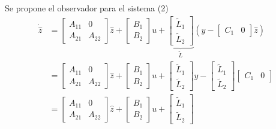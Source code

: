 Se propone el observador para el sistema (2)
\[
    \begin{split}
        \dot{\hat{z}} & = 
        \begin{bmatrix}
            A_{11} & 0 \\ 
            A_{21} & A_{22}
        \end{bmatrix} \hat{z} +
        \begin{bmatrix}
            B_{1} \\ B_{2}
        \end{bmatrix} u +
        \underbrace{
            \begin{bmatrix}
                \tilde{L}_{1} \\ \tilde{L}_{2}
            \end{bmatrix}
        }_{\tilde{L}}
        (y - \begin{bmatrix}
                C_{1} & 0
             \end{bmatrix} \hat{z} ) \\
        & = 
        \begin{bmatrix}
            A_{11} & 0 \\ 
            A_{21} & A_{22}
        \end{bmatrix} \hat{z} +
        \begin{bmatrix}
            B_{1} \\ B_{2}
        \end{bmatrix} u +
        \begin{bmatrix}
            \tilde{L}_{1} \\ \tilde{L}_{2}
        \end{bmatrix} y -
        \begin{bmatrix}
            \tilde{L}_{1} \\ \tilde{L}_{2}
        \end{bmatrix}
        \begin{bmatrix}
            C_{1} & 0
        \end{bmatrix} \\
        & = 
        \begin{bmatrix}
            A_{11} & 0 \\ 
            A_{21} & A_{22}
        \end{bmatrix} \hat{z} +
        \begin{bmatrix}
            B_{1} \\ B_{2}
        \end{bmatrix} u +
        \begin{bmatrix}
            \tilde{L}_{1} \\ \tilde{L}_{2}

\end{bmatrix}
\end{split}\]
